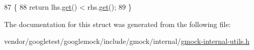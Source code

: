 \begin{DoxyCode}
87                                                                  \{
88     \textcolor{keywordflow}{return} lhs.\hyperlink{classtesting_1_1internal_1_1linked__ptr_a6ea8584d9bcad13c3266834f5ce5e771}{get}() < rhs.\hyperlink{classtesting_1_1internal_1_1linked__ptr_a6ea8584d9bcad13c3266834f5ce5e771}{get}();
89   \}
\end{DoxyCode}


The documentation for this struct was generated from the following file\+:\begin{DoxyCompactItemize}
\item 
vendor/googletest/googlemock/include/gmock/internal/\hyperlink{gmock-internal-utils_8h}{gmock-\/internal-\/utils.\+h}\end{DoxyCompactItemize}
